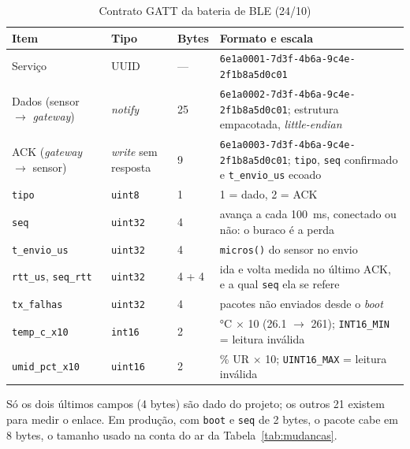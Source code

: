 \begin{table}[H]
\centering
\caption{Contrato GATT da bateria de BLE (24/10)}
\label{tab:gatt}
\footnotesize
\setlength{\tabcolsep}{3.5pt}
\begin{tabular}{@{}L{3.2cm}L{2.4cm}L{2.0cm}L{6.4cm}@{}}
\toprule
\textbf{Item} & \textbf{Tipo} & \textbf{Bytes} & \textbf{Formato e escala} \\
\midrule
Serviço & UUID & --- & \texttt{6e1a0001-7d3f-4b6a-9c4e-2f1b8a5d0c01} \\
Dados (sensor $\rightarrow$ \emph{gateway}) & \emph{notify} & 25 & \texttt{6e1a0002-7d3f-4b6a-9c4e-2f1b8a5d0c01}; estrutura empacotada, \emph{little-endian} \\
ACK (\emph{gateway} $\rightarrow$ sensor) & \emph{write} sem resposta & 9 & \texttt{6e1a0003-7d3f-4b6a-9c4e-2f1b8a5d0c01}; \texttt{tipo}, \texttt{seq} confirmado e \texttt{t\_envio\_us} ecoado \\
\midrule
\texttt{tipo} & \texttt{uint8} & 1 & 1 = dado, 2 = ACK \\
\texttt{seq} & \texttt{uint32} & 4 & avança a cada \SI{100}{\milli\second}, conectado ou não: o buraco é a perda \\
\texttt{t\_envio\_us} & \texttt{uint32} & 4 & \texttt{micros()} do sensor no envio \\
\texttt{rtt\_us}, \texttt{seq\_rtt} & \texttt{uint32} & 4 + 4 & ida e volta medida no último ACK, e a qual \texttt{seq} ela se refere \\
\texttt{tx\_falhas} & \texttt{uint32} & 4 & pacotes não enviados desde o \emph{boot} \\
\texttt{temp\_c\_x10} & \texttt{int16} & 2 & \si{\celsius} $\times$ 10 (\num{26.1} $\rightarrow$ 261); \texttt{INT16\_MIN} = leitura inválida \\
\texttt{umid\_pct\_x10} & \texttt{uint16} & 2 & \% UR $\times$ 10; \texttt{UINT16\_MAX} = leitura inválida \\
\bottomrule
\end{tabular}
\end{table}

Só os dois últimos campos (4 bytes) são dado do projeto; os outros 21
existem para medir o enlace. Em produção, com \texttt{boot} e
\texttt{seq} de 2 bytes, o pacote cabe em 8 bytes, o tamanho usado na
conta do ar da Tabela~\ref{tab:mudancas}.

